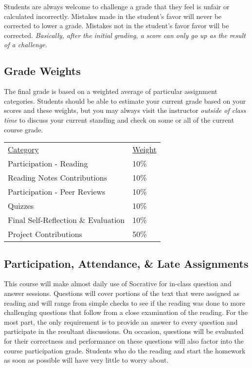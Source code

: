\documentclass[10pt]{article}
\begin{document}
Students are always welcome to challenge a grade that they feel is unfair or calculated incorrectly.  Mistakes made in the student's favor will never be corrected to lower a grade.  Mistakes not in the student's favor favor will be corrected.  \textit{Basically, after the initial grading, a score can only go up as the result of a challenge.}

\subsection{Grade Weights}

The final grade is based on a weighted average of particular assignment categories.  Students should be able to estimate your current grade based on your scores and these weights, but you may always visit the instructor \textit{outside of class time} to discuss your current standing and check on some or all of the current course grade.

\begin{center}
  \begin{tabular}{ll}
  \underline{Category} & \underline{Weight} \\
    Participation - Reading &  10\%\\
    Reading Notes Contributions & 10\%\\
    Participation - Peer Reviews & 10\%\\
    Quizzes & 10\%\\
    Final Self-Reflection \& Evaluation & 10\%\\
    Project Contributions & 50\%\\
  \end{tabular}
\end{center}

\subsection{Participation, Attendance, \& Late Assignments}

This course will make almost daily use of Socrative for in-class question and answer sessions. Questions will cover portions of the text that were assigned as reading and will range from simple checks to see if the reading was done to more challenging questions that follow from a close examination of the reading.  For the most part, the only requirement is to provide an answer to every question and participate in the resultant discussions.  On occasion, questions will be evaluated for their correctness and performance on these questions will also factor into the course participation grade.  Students who do the reading and start the homework as soon as possible will have very little to worry about.
\end{document}
